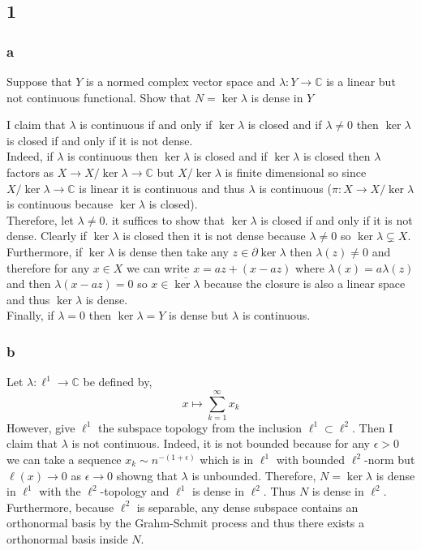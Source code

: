 \documentclass[12pt]{article}
\renewcommand{\C}{\mathbb{C}}
\begin{document}
\subsection{1}

\subsubsection{a}

\begin{exercise}
Suppose that $Y$ is a normed complex vector space and $\lambda : Y \to \C$ is a linear but not continuous functional. Show that $N = \ker{\lambda}$ is dense in $Y$
\end{exercise}

I claim that $\lambda$ is continuous if and only if $\ker{\lambda}$ is closed and if $\lambda \neq 0$ then $\ker{\lambda}$ is closed if and only if it is not dense.
\bigskip\\
Indeed, if $\lambda$ is continuous then $\ker{\lambda}$ is closed and if $\ker{\lambda}$ is closed then $\lambda$ factors as $X \to X / \ker{\lambda} \to \C$ but $X / \ker{\lambda}$ is finite dimensional so since $X / \ker{\lambda} \to \C$ is linear it is continuous and thus $\lambda$ is continuous ($\pi : X \to X / \ker{\lambda}$ is continuous because $\ker{\lambda}$ is closed). 
\bigskip\\
Therefore, let $\lambda \neq 0$. it suffices to show that $\ker{\lambda}$ is closed if and only if it is not dense. Clearly if $\ker{\lambda}$ is closed then it is not dense because $\lambda \neq 0$ so $\ker{\lambda} \subsetneq X$. Furthermore, if $\ker{\lambda}$ is dense then take any $z \in \partial \ker{\lambda}$ then $\lambda(z) \neq 0$ and therefore for any $x \in X$ we can write $x = a z + (x - az)$ where $\lambda(x) = a \lambda(z)$ and then $\lambda(x - az) =  0$ so $x \in \overline{\ker{\lambda}}$ because the closure is also a linear space and thus $\ker{\lambda}$ is dense.
\bigskip\\
Finally, if $\lambda = 0$ then $\ker{\lambda} = Y$ is dense but $\lambda$ is continuous. 

\subsubsection{b}

Let $\lambda : \ell^1 \to \C$ be defined by,
\[ x \mapsto \sum_{k = 1}^\infty x_k  \]
However, give $\ell^1$ the subspace topology from the inclusion $\ell^1 \subset \ell^2$. Then I claim that $\lambda$ is not continuous. Indeed, it is not bounded because for any $\epsilon > 0$ we can take a sequence $x_k \sim n^{-(1 + \epsilon)}$ which is in $\ell^1$ with bounded $\ell^2$-norm but $\ell(x) \to 0$ as $\epsilon \to 0$ showng that $\lambda$ is unbounded. Therefore, $N = \ker{\lambda}$ is dense in $\ell^1$ with the $\ell^2$-topology and $\ell^1$ is dense in $\ell^2$. Thus $N$ is dense in $\ell^2$. Furthermore, because $\ell^2$ is separable, any dense subspace contains an orthonormal basis by the Grahm-Schmit process and thus there exists a orthonormal basis inside $N$.
\end{document}
